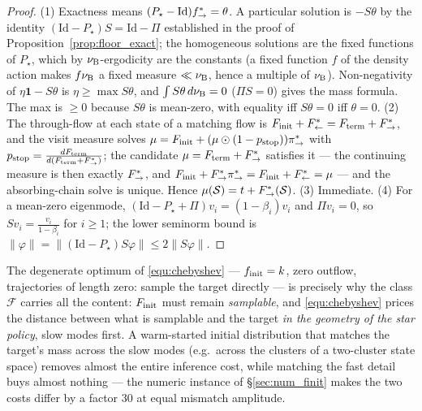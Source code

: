 \begin{proof}
(1) Exactness means $(P_\star-\mathrm{Id})f^*_{\rightarrow}=\theta$. A particular solution is
$-S\theta$ by the identity $(\mathrm{Id}-P_\star)S=\mathrm{Id}-\Pi$ established in the
proof of Proposition~\ref{prop:floor_exact}; the homogeneous solutions are the fixed
functions of $P_\star$, which by $\nu_{\mathrm{B}}$-ergodicity are the constants (a fixed function
$f$ of the density action makes $f\nu_{\mathrm{B}}$ a fixed measure $\ll\nu_{\mathrm{B}}$, hence a multiple
of $\nu_{\mathrm{B}}$). Non-negativity of $\eta\mathbf 1-S\theta$ is $\eta\geq\max S\theta$, and
$\int S\theta\,d\nu_{\mathrm{B}}=0$ ($\Pi S=0$) gives the mass formula. The max is $\geq0$ because
$S\theta$ is mean-zero, with equality iff $S\theta=0$ iff $\theta=0$.
(2) The through-flow at each state of a matching flow is
$F_{\mathrm{init}}+F^*_{\leftarrow}=F_{\mathrm{term}}+F^*_{\rightarrow}$, and the visit measure solves
$\mu=F_{\mathrm{init}}+(\mu\odot(1-p_{\mathrm{stop}}))\pi_{\rightarrow}^*$ with
$p_{\mathrm{stop}}=\frac{dF_{\mathrm{term}}}{d(F_{\mathrm{term}}+F^*_{\rightarrow})}$; the candidate
$\mu=F_{\mathrm{term}}+F^*_{\rightarrow}$ satisfies it --- the continuing measure is then exactly
$F^*_{\rightarrow}$, and $F_{\mathrm{init}}+F^*_{\rightarrow}\pi_{\rightarrow}^*=F_{\mathrm{init}}+F^*_{\leftarrow}=\mu$ --- and the
absorbing-chain solve is unique. Hence $\mu(\mathcal S)=t+F^*_{\rightarrow}(\mathcal S)$.
(3) Immediate. (4) For a mean-zero eigenmode, $(\mathrm{Id}-P_\star+\Pi)v_i=(1-\beta_i)v_i$
and $\Pi v_i=0$, so $Sv_i=\frac{v_i}{1-\beta_i}$ for
$i\geq1$; the lower seminorm bound is $\|\varphi\|=\|(\mathrm{Id}-P_\star)S\varphi\|\leq
2\|S\varphi\|$.
\end{proof}

The degenerate optimum of \eqref{equ:chebyshev} --- $f_{\mathrm{init}}=k$, zero outflow, trajectories
of length zero: sample the target directly --- is precisely why the class $\mathcal F$
carries all the content: $F_{\mathrm{init}}$ must remain \emph{samplable}, and
\eqref{equ:chebyshev} prices the distance between what is samplable and the target
\emph{in the geometry of the star policy}, slow modes first. A warm-started initial
distribution that matches the target's mass across the slow modes (e.g.\ across the
clusters of a two-cluster state space) removes almost the entire inference cost, while
matching the fast detail buys almost nothing --- the numeric instance of
\S\ref{sec:num_finit} makes the two costs differ by a factor $30$ at equal mismatch
amplitude.

